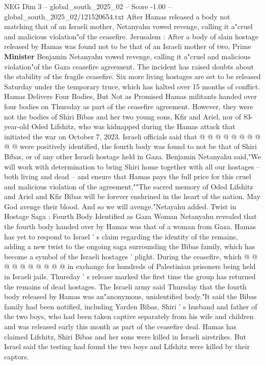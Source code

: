 \begin{textsample}{NEG Dim 3 – global\_south\_2025\_02 – Score -1.00 – global\_south\_2025\_02/121520654.txt}  \label{ex:f3_neg_016}
After Hamas released a body not matching that of an Israeli mother, Netanyahu vowed revenge, calling it a"cruel and malicious violation"of the ceasefire.
Jerusalem : After a body of slain hostage released by Hamas was found not to be that of an Israeli mother of two, Prime \textbf{Minister} Benjamin Netanyahu vowed revenge, calling it a"cruel and malicious violation"of the Gaza ceasefire agreement.
The incident has raised doubts about the stability of the fragile ceasefire.
Six more living hostages are set to be released Saturday under the temporary truce, which has halted over 15 months of conflict.
Hamas Delivers Four Bodies, But Not as Promised Hamas militants handed over four bodies on Thursday as part of the ceasefire agreement.
However, they were not the bodies of Shiri Bibas and her two young sons, Kfir and Ariel, nor of 83-year-old Oded Lifshitz, who was kidnapped during the Hamas attack that initiated the war on October 7, 2023.
Israeli officials said that @ @ @ @ @ @ @ @ @ @ were positively identified, the fourth body was found to not be that of Shiri Bibas, or of any other Israeli hostage held in Gaza.
Benjamin Netanyahu said,"We will work with determination to bring Shiri home together with all our hostages -- both living and dead -- and ensure that Hamas pays the full price for this cruel and malicious violation of the agreement,""The sacred memory of Oded Lifshitz and Ariel and Kfir Bibas will be forever enshrined in the heart of the nation.
May God avenge their blood.
And so we will avenge."Netayahu added.
Twist in Hostage Saga : Fourth Body Identified as Gaza Woman Netanyahu revealed that the fourth body handed over by Hamas was that of a woman from Gaza.
Hamas has yet to respond to Israel ' s claim regarding the identity of the remains, adding a new twist to the ongoing saga surrounding the Bibas family, which has become a symbol of the Israeli hostages ' plight.
During the ceasefire, which @ @ @ @ @ @ @ @ @ @ in exchange for hundreds of Palestinian prisoners being held in Israeli jails.
Thursday ' s release marked the first time the group has returned the remains of dead hostages.
The Israeli army said Thursday that the fourth body released by Hamas was an"anonymous, unidentified body."It said the Bibas family had been notified, including Yarden Bibas, Shiri ' s husband and father of the two boys, who had been taken captive separately from his wife and children and was released early this month as part of the ceasefire deal.
Hamas has claimed Lifshitz, Shiri Bibas and her sons were killed in Israeli airstrikes.
But Israel said the testing had found the two boys and Lifshitz were killed by their captors.

\end{textsample}
